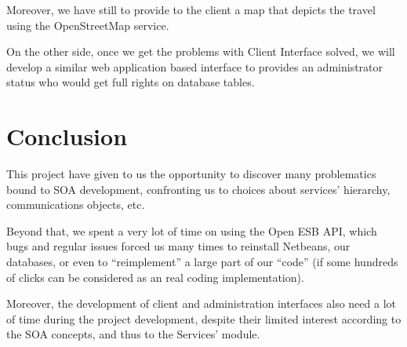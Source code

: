 \documentclass[a4paper]{article}
\begin{document}
		Moreover, we have still to provide to the client a map that depicts the travel using the OpenStreetMap service.
		
		On the other side, once we get the problems with Client Interface solved, we will develop a similar web application based interface to provides an administrator status who would get full rights on database tables.
	
	\section*{Conclusion}

		This project have given to us the opportunity to discover many problematics bound to SOA development, confronting us to choices about services' hierarchy, communications objects, etc.
		
		Beyond that, we spent a very lot of time on using the Open ESB API, which bugs and regular issues forced us many times to reinstall Netbeans, our databases, or even to ``reimplement'' a large part of our ``code'' (if some hundreds of clicks can be considered as an real coding implementation).
		
		Moreover, the development of client and administration interfaces also need a lot of time during the project development, despite their limited interest according to the SOA concepts, and thus to the Services' module.
\end{document}
